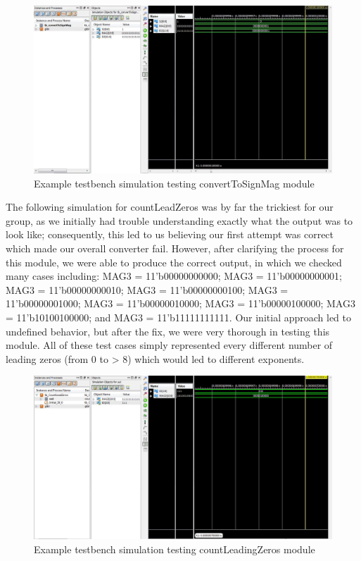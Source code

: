 \documentclass{article}
\begin{document}
\begin{figure}[H]
	\begin{center}
		\includegraphics[width=1.2\textwidth]{sim1.png} 
		\caption{Example testbench simulation testing convertToSignMag module}
	\end{center}
\end{figure}

The following simulation for countLeadZeros was by far the trickiest for our group, as we initially had trouble understanding exactly what the output was to look like; consequently, this led to us believing our first attempt was correct which made our overall converter fail.  However, after clarifying the process for this module, we were able to produce the correct output, in which we checked many cases including: MAG3 = 11'b00000000000; MAG3 = 11'b00000000001; MAG3 = 11'b00000000010; MAG3 = 11'b00000000100; MAG3 = 11'b00000001000; MAG3 = 11'b00000010000; MAG3 = 11'b00000100000; MAG3 = 11'b10100100000; and MAG3 = 11'b11111111111.  Our initial approach led to undefined behavior, but after the fix, we were very thorough in testing this module.  All of these test cases simply represented every different number of leading zeros (from 0 to > 8) which would led to different exponents.

\begin{figure}[H]
	\begin{center}
		\includegraphics[width=1.2\textwidth]{sim2.png} 
		\caption{Example testbench simulation testing countLeadingZeros module}
	\end{center}
\end{figure}
\end{document}
